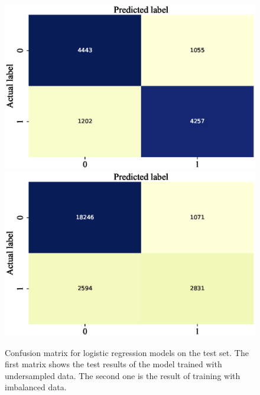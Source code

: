 \documentclass[11pt, a4paper, jou]{apa7}
\begin{document}
\begin{figure}[p]
    \centering
    \caption{Confusion matrix for logistic regression models on the test set. The first matrix shows the test results of the model trained with undersampled data. The second one is the result of training with imbalanced data. }\label{fig:log_cm}
    \includegraphics[width=.45\textwidth]{figures/log_cm.eps}
    \includegraphics[width=.45\textwidth]{figures/Logit_confusion_matrix_without_undersampling.eps}
\end{figure}
\end{document}
